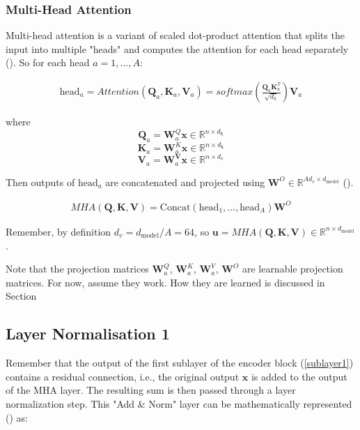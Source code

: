 \subsubsection{Multi-Head Attention}

Multi-head attention is a variant of scaled dot-product attention that splits the input into multiple "heads" and computes the attention for each head separately (\cite{tunstall_natural_2022}). So for each head $ a = 1, \dots, A$:

\begin{align*}
    \text{head}_a = Attention(\mathbf{Q}_a, \mathbf{K}_a, \mathbf{V}_a) = softmax(\frac{\mathbf{Q}_{a}\mathbf{K}_{a}^T}{\sqrt{d_k}})\mathbf{V}_a
\end{align*}

where 
$$ \mathbf{Q}_a = \mathbf{W}_a^Q \mathbf{x} \in \mathbb{R}^
{n \times d_{\text{k}}}$$
$$ \mathbf{K}_a = \mathbf{W}_a^K \mathbf{x} \in \mathbb{R}^
{n \times d_{\text{k}}}$$
$$ \mathbf{V}_a = \mathbf{W}_a^\mathbf{V} \mathbf{x} \in \mathbb{R}^
{n \times d_{\text{v}}}$$

Then outputs of $\text{head}_a$ are concatenated and projected using $\mathbf{W}^O \in \mathbb{R}^
{Ad_v \times d_{\text{model}}}$ (\cite{vaswani_attention_2017}).

\begin{align*}
    MHA(\mathbf{Q}, \mathbf{K}, \mathbf{V}) = \text{Concat}(\text{head}_1, \dots, \text{head}_A)\mathbf{W}^O
\end{align*}

Remember, by definition $d_v = d_\text{model}/A = 64$, so  $\mathbf{u} = MHA(\mathbf{Q}, \mathbf{K}, \mathbf{V}) \in \mathbb{R}^
{n \times d_{\text{model}}}$.

Note that the projection matrices $\mathbf{W}_a^Q$, $\mathbf{W}_a^K$, $\mathbf{W}_a^V$, $\mathbf{W}^O$ are learnable projection matrices. For now, assume they work. How they are learned is discussed in Section %

\subsection{Layer Normalisation 1}

Remember that the output of the first sublayer of the encoder block (\ref{sublayer1}) contains a residual connection, i.e., the original output $\mathbf{x}$ is added to the output of the MHA layer. The resulting sum is then passed through a layer normalization step. This "Add \& Norm" layer can be mathematically represented (\cite{thickstun_transformer_2020}) as:

